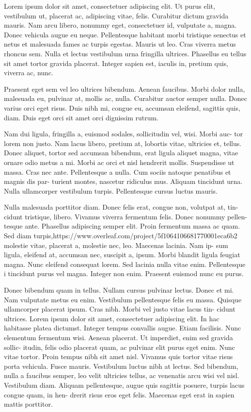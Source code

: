 Lorem ipsum dolor sit amet, consectetuer adipiscing elit. Ut purus elit, vestibulum ut,
placerat ac, adipiscing vitae, felis. Curabitur dictum gravida mauris. Nam arcu libero,
nonummy eget, consectetuer id, vulputate a, magna. Donec vehicula augue eu neque.
Pellentesque habitant morbi tristique senectus et netus et malesuada fames ac turpis
egestas. Mauris ut leo. Cras viverra metus rhoncus sem. Nulla et lectus vestibulum urna
fringilla ultrices. Phasellus eu tellus sit amet tortor gravida placerat. Integer sapien
est, iaculis in, pretium quis, viverra ac, nunc.

Praesent eget sem vel leo ultrices bibendum. Aenean faucibus. Morbi dolor nulla,
malesuada eu, pulvinar at, mollis ac, nulla. Curabitur auctor semper nulla. Donec varius
orci eget risus. Duis nibh mi, congue eu, accumsan eleifend, sagittis quis, diam. Duis
eget orci sit amet orci dignissim rutrum.

Nam dui ligula, fringilla a, euismod sodales, sollicitudin vel, wisi. Morbi auc- tor
lorem non justo. Nam lacus libero, pretium at, lobortis vitae, ultricies et, tellus.
Donec aliquet, tortor sed accumsan bibendum, erat ligula aliquet magna, vitae ornare odio
metus a mi. Morbi ac orci et nisl hendrerit mollis. Suspendisse ut massa. Cras nec ante.
Pellentesque a nulla. Cum sociis natoque penatibus et magnis dis par- turient montes,
nascetur ridiculus mus. Aliquam tincidunt urna. Nulla ullamcorper vestibulum turpis.
Pellentesque cursus luctus mauris.

Nulla malesuada porttitor diam. Donec felis erat, congue non, volutpat at, tin- cidunt
tristique, libero. Vivamus viverra fermentum felis. Donec nonummy pellen- tesque ante.
Phasellus adipiscing semper elit. Proin fermentum massa ac quam. Sed diam turpis,https://www.overleaf.com/project/5f1064106681770001eca6b2
molestie vitae, placerat a, molestie nec, leo. Maecenas lacinia. Nam ip- sum ligula,
eleifend at, accumsan nec, suscipit a, ipsum. Morbi blandit ligula feugiat magna.
Nunc eleifend consequat lorem. Sed lacinia nulla vitae enim. Pellentesque i
tincidunt
purus vel magna. Integer non enim. Praesent euismod nunc eu purus.

Donec bibendum quam in tellus. Nullam cursus pulvinar lectus. Donec et mi. Nam vulputate
metus eu enim. Vestibulum pellentesque felis eu massa. Quisque ullamcorper placerat
ipsum. Cras nibh. Morbi vel justo vitae lacus tin- cidunt ultrices. Lorem ipsum dolor sit
amet, consectetuer adipiscing elit. In hac habitasse platea dictumst. Integer tempus
convallis augue. Etiam facilisis. Nunc elementum fermentum wisi. Aenean placerat. Ut
imperdiet, enim sed gravida sollic- itudin, felis odio placerat quam, ac pulvinar elit
purus eget enim. Nunc vitae tortor. Proin tempus nibh sit amet nisl. Vivamus quis tortor
vitae risus porta vehicula. Fusce mauris. Vestibulum luctus nibh at lectus. Sed bibendum,
nulla a faucibus semper, leo velit ultricies tellus, ac venenatis arcu wisi vel nisl.
Vestibulum diam. Aliquam pellentesque, augue quis sagittis posuere, turpis lacus congue
quam, in hen- drerit risus eros eget felis. Maecenas eget erat in sapien mattis
porttitor.